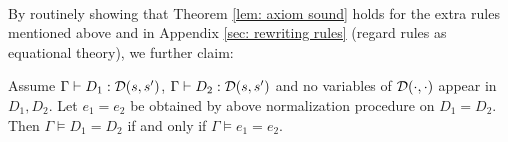 \paragraph*{}
By routinely showing that Theorem \ref{lem: axiom sound} holds for the extra rules mentioned above and in Appendix \ref{sec: rewriting rules} (regard rules as equational theory), we further claim:
\begin{theorem}
  \label{thm: normalization}
  Assume $\Gamma\vdash D_1 : {\mathcal{D}}(s,s')$, $\Gamma\vdash D_2 : {\mathcal{D}}(s,s')$
  and no variables of $\mathcal{D}(\cdot,\cdot)$ appear in $D_1,D_2$.
  Let $e_1 = e_2$ be obtained by above normalization procedure on $D_1 = D_2$. Then $\Gamma\vDash D_1 = D_2$ if and only if $\Gamma\vDash e_1 = e_2$.
\end{theorem}


